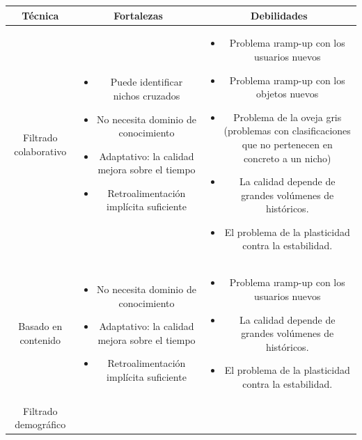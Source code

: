 		\clearpage
 		\begin{table}[h]
		\begin{center}
		 \begin{tabular}{| c | c | c |}
		 \toprule
		 	\textbf{Técnica} & \textbf{Fortalezas} & \textbf{Debilidades}\\
		 \midrule
		 	Filtrado colaborativo & 
		 	\parbox{5cm}{\begin{itemize}[topsep=0pt]
		 		\item Puede identificar nichos cruzados
		 		\item No necesita dominio de conocimiento
		 		\item Adaptativo: la calidad mejora sobre el tiempo
		 		\item Retroalimentación implícita suficiente
		 	\end{itemize}} &
		 	\parbox{5cm}{\begin{itemize}[topsep=0pt]
		 		\item Problema \i{ramp-up} con los usuarios nuevos
		 		\item Problema \i{ramp-up} con los objetos nuevos
		 		\item Problema de la oveja gris (problemas con clasificaciones que no pertenecen en concreto a un nicho)
		 		\item La calidad depende de grandes volúmenes de históricos.
		 		\item El problema de la plasticidad contra la estabilidad.
		 	\end{itemize}} \\
		 \midrule
		 	Basado en contenido & 
		 	\parbox{5cm}{\begin{itemize}[topsep=0pt]
		 		\item No necesita dominio de conocimiento
		 		\item Adaptativo: la calidad mejora sobre el tiempo
		 		\item Retroalimentación implícita suficiente
		 	\end{itemize}} &
		 	\parbox{5cm}{\begin{itemize}[topsep=0pt]
		 		\item Problema \i{ramp-up} con los usuarios nuevos
		 		\item La calidad depende de grandes volúmenes de históricos.
		 		\item El problema de la plasticidad contra la estabilidad.
		 	\end{itemize}} \\
		 \midrule
		 	Filtrado demográfico & 

\end{tabular}
\end{center}
\end{table}
